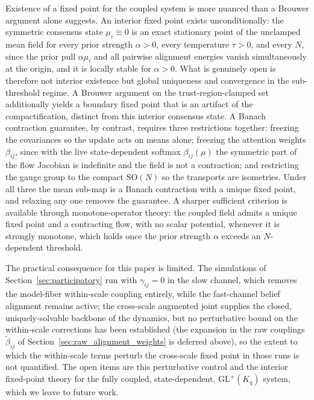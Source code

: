 \documentclass[11pt]{article}
\begin{document}
Existence of a fixed point for the coupled system is more nuanced than a Brouwer argument alone suggests. An interior fixed point exists unconditionally: the symmetric consensus state $\mu_i \equiv 0$ is an exact stationary point of the unclamped mean field for every prior strength $\alpha > 0$, every temperature $\tau > 0$, and every $N$, since the prior pull $\alpha\mu_i$ and all pairwise alignment energies vanish simultaneously at the origin, and it is locally stable for $\alpha > 0$. What is genuinely open is therefore not interior existence but global uniqueness and convergence in the sub-threshold regime. A Brouwer argument on the trust-region-clamped set additionally yields a boundary fixed point that is an artifact of the compactification, distinct from this interior consensus state. A Banach contraction guarantee, by contrast, requires three restrictions together: freezing the covariances so the update acts on means alone; freezing the attention weights $\beta_{ij}$, since with the live state-dependent softmax $\beta_{ij}(\mu)$ the symmetric part of the flow Jacobian is indefinite and the field is not a contraction; and restricting the gauge group to the compact $\mathrm{SO}(N)$ so the transports are isometries. Under all three the mean sub-map is a Banach contraction with a unique fixed point, and relaxing any one removes the guarantee. A sharper sufficient criterion is available through monotone-operator theory: the coupled field admits a unique fixed point and a contracting flow, with no scalar potential, whenever it is strongly monotone, which holds once the prior strength $\alpha$ exceeds an $N$-dependent threshold.

The practical consequence for this paper is limited. The simulations of Section~\ref{sec:participatory} run with $\gamma_{ij} = 0$ in the slow channel, which removes the model-fiber within-scale coupling entirely, while the fast-channel belief alignment remains active; the cross-scale augmented joint supplies the closed, uniquely-solvable backbone of the dynamics, but no perturbative bound on the within-scale corrections has been established (the expansion in the raw couplings $\tilde\beta_{ij}$ of Section~\ref{sec:raw_alignment_weights} is deferred above), so the extent to which the within-scale terms perturb the cross-scale fixed point in those runs is not quantified. The open items are this perturbative control and the interior fixed-point theory for the fully coupled, state-dependent, $\mathrm{GL}^+(K_q)$ system, which we leave to future work.
\end{document}
